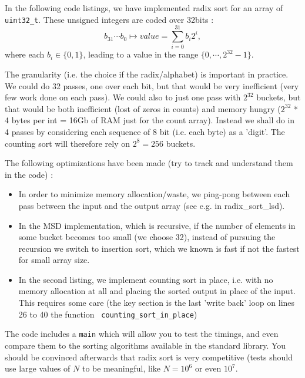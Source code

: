 \documentclass[12pt]{article}
\theoremstyle{plain}
\theoremstyle{remark}
\begin{document}
In the following code listings, we have implemented radix sort for an array of
{\tt uint32\_t}. These unsigned integers are coded over 32bits :
$$
b_{31}\cdots b_0 \mapsto value = \sum_{i=0}^{31} b_i 2^i,
$$
where each $b_i \in \{0, 1\}$, leading to a value in the range $\{0, \cdots,
2^{32} - 1\}$.

The granularity (i.e. the choice if the radix/alphabet) is important in practice. We could
do 32 passes, one over each bit, but that would be very inefficient (very few
work done on each pass). We could also to just one pass with $2^{32}$ buckets, 
but that would be both inefficient (lost of zeros in counts) and memory hungry 
($2^{32}$ * 4 bytes per int = 16Gb of RAM just for the count array).
Instead we shall do in 4 passes by considering each sequence of 8 bit (i.e. each
byte) as a 'digit'. The counting sort will therefore rely on $2^8 = 256$ buckets.

\medskip

The following optimizations have been made (try to track and understand them in
the code) : 

\begin{itemize}
	\item In order to minimize memory allocation/waste, we ping-pong between
		each pass between the input and the output array (see e.g. in
		radix\_sort\_lsd).
	\item In the MSD implementation, which is recursive, if the
		number of elements in some bucket becomes too small (we choose 
		32), instead of pursuing the recursion we switch to insertion
		sort, which we known is fast if not the fastest for small array
		size.
	\item In the second listing, we implement counting sort in place, i.e.
		with no memory allocation at all and placing the sorted output
		in place of the input. This requires some care (the key section
		is the last 'write back' loop on lines 26 to 40 the function {\tt
		counting\_sort\_in\_place})
\end{itemize}


The code includes a {\tt main} which will allow you to test the timings, and
even compare them to the sorting algorithms available in the standard library.
You should be convinced afterwards that radix sort is very competitive (tests
should use large values of $N$ to be meaningful, like $N = 10^6$ or even $10^7.$
\end{document}
